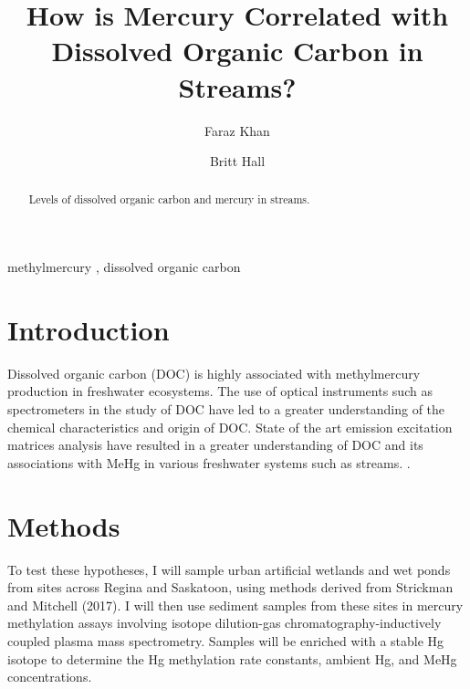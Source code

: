 \documentclass[preprint, 3p,
authoryear]{elsarticle} %
\begin{document}
\begin{frontmatter}

  \title{How is Mercury Correlated with Dissolved Organic Carbon in
Streams?}
    \author[University of Regina]{Faraz Khan%
  }
    \author[University of Regina]{Britt Hall%
  }
  
  \begin{abstract}
  Levels of dissolved organic carbon and mercury in streams.
  \end{abstract}
    \begin{keyword}
    methylmercury \sep 
    dissolved organic carbon
  \end{keyword}
  
 \end{frontmatter}

\hypertarget{introduction}{%
\section{Introduction}\label{introduction}}

Dissolved organic carbon (DOC) is highly associated with methylmercury
production in freshwater ecosystems. The use of optical instruments such
as spectrometers in the study of DOC have led to a greater understanding
of the chemical characteristics and origin of DOC. State of the art
emission excitation matrices analysis have resulted in a greater
understanding of DOC and its associations with MeHg in various
freshwater systems such as streams. \citep{Graham2013}.

\hypertarget{methods}{%
\section{Methods}\label{methods}}

To test these hypotheses, I will sample urban artificial wetlands and
wet ponds from sites across Regina and Saskatoon, using methods derived
from Strickman and Mitchell (2017). I will then use sediment samples
from these sites in mercury methylation assays involving isotope
dilution-gas chromatography-inductively coupled plasma mass
spectrometry. Samples will be enriched with a stable Hg isotope to
determine the Hg methylation rate constants, ambient Hg, and MeHg
concentrations.
\end{document}
